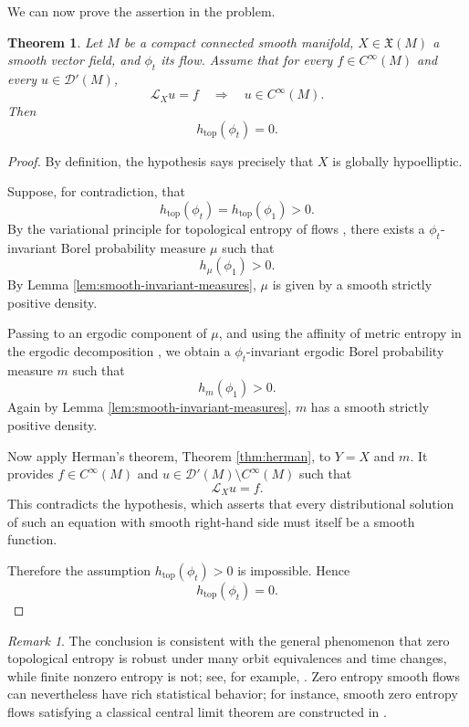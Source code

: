 \documentclass[11pt]{article}
\newtheorem{theorem}{Theorem}
\theoremstyle{definition}
\theoremstyle{remark}
\newtheorem{remark}{Remark}
\numberwithin{equation}{section}
\begin{document}
We can now prove the assertion in the problem.

\begin{theorem}
Let \(M\) be a compact connected smooth manifold, \(X\in\mathfrak X(M)\) a smooth
vector field, and \(\phi_t\) its flow. Assume that for every
\(f\in C^\infty(M)\) and every \(u\in\mathcal D'(M)\),
\[
  \mathcal L_Xu=f
  \quad\Longrightarrow\quad
  u\in C^\infty(M).
\]
Then
\[
  h_{\mathrm{top}}(\phi_t)=0.
\]
\end{theorem}

\begin{proof}
By definition, the hypothesis says precisely that \(X\) is globally
hypoelliptic.

Suppose, for contradiction, that
\[
  h_{\mathrm{top}}(\phi_t)=h_{\mathrm{top}}(\phi_1)>0.
\]
By the variational principle for topological entropy of flows
\cite{walters,exa}, there exists a \(\phi_t\)-invariant Borel probability measure
\(\mu\) such that
\[
  h_\mu(\phi_1)>0.
\]
By Lemma \ref{lem:smooth-invariant-measures}, \(\mu\) is given by a smooth
strictly positive density.

Passing to an ergodic component of \(\mu\), and using the affinity of metric
entropy in the ergodic decomposition \cite{walters}, we obtain a
\(\phi_t\)-invariant ergodic Borel probability measure \(m\) such that
\[
  h_m(\phi_1)>0.
\]
Again by Lemma \ref{lem:smooth-invariant-measures}, \(m\) has a smooth strictly
positive density.

Now apply Herman's theorem, Theorem \ref{thm:herman}, to \(Y=X\) and \(m\). It
provides \(f\in C^\infty(M)\) and \(u\in\mathcal D'(M)\setminus C^\infty(M)\)
such that
\[
  \mathcal L_Xu=f.
\]
This contradicts the hypothesis, which asserts that every distributional
solution of such an equation with smooth right-hand side must itself be a smooth
function.

Therefore the assumption \(h_{\mathrm{top}}(\phi_t)>0\) is impossible. Hence
\[
  h_{\mathrm{top}}(\phi_t)=0.
\]
\end{proof}

\begin{remark}
The conclusion is consistent with the general phenomenon that zero topological
entropy is robust under many orbit equivalences and time changes, while finite
nonzero entropy is not; see, for example, \cite{exa,equiv}. Zero entropy smooth
flows can nevertheless have rich statistical behavior; for instance, smooth zero
entropy flows satisfying a classical central limit theorem are constructed in
\cite{jep}.
\end{remark}
\end{document}
